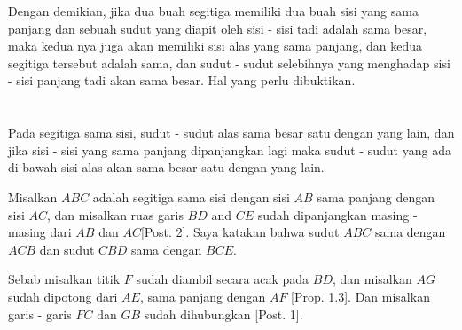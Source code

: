 \documentclass[a4paper]{book}
\begin{document}
Dengan demikian, jika dua buah segitiga memiliki dua buah sisi yang sama
panjang dan sebuah sudut yang diapit oleh sisi - sisi tadi adalah sama besar,
maka kedua nya juga akan memiliki sisi alas yang sama panjang, dan kedua
segitiga tersebut adalah sama, dan sudut - sudut selebihnya yang menghadap
sisi - sisi panjang tadi akan sama besar. Hal yang perlu dibuktikan.

\section*{\centering \thesection} 

Pada segitiga sama sisi, sudut - sudut alas sama besar satu dengan yang lain, 
dan jika sisi - sisi yang sama panjang dipanjangkan lagi maka sudut - sudut 
yang ada di bawah sisi alas akan sama besar satu dengan yang lain.

\begin{center}
\end{center}

Misalkan $ABC$ adalah segitiga sama sisi dengan sisi $AB$ sama panjang dengan 
sisi $AC$, dan misalkan ruas garis $BD$ and $CE$ sudah dipanjangkan 
masing - masing dari $AB$ dan $AC$[Post. 2].  Saya katakan bahwa sudut $ABC$ 
sama dengan $ACB$ dan sudut $CBD$ sama dengan $BCE$.

Sebab misalkan titik $F$ sudah diambil secara acak pada $BD$, dan misalkan 
$AG$ sudah dipotong dari  $AE$, sama panjang dengan $AF$ [Prop. 1.3]. Dan 
misalkan garis - garis $FC$ dan $GB$ sudah dihubungkan [Post. 1].
\end{document}
